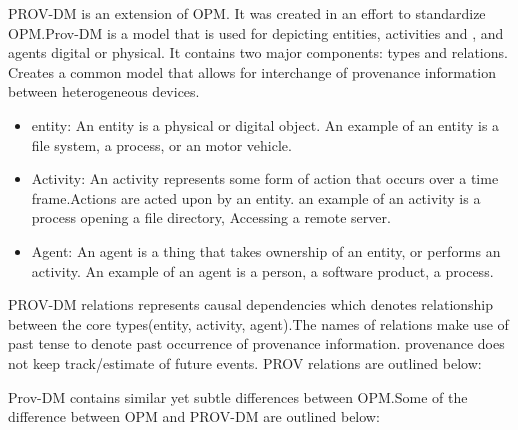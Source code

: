 PROV-DM is an extension of OPM. It was created in an effort to standardize OPM.Prov-DM is a model that is used for depicting entities, activities and , and agents digital or physical.  It contains two major components: types and relations. Creates a common model that allows for interchange of provenance information between heterogeneous devices. 

\begin{itemize}

\item entity: An entity is a physical or digital object. An example of an entity is a file system, a process, or an motor vehicle.

\item Activity: An activity represents some form of action that occurs over a time frame.Actions are acted upon by an entity. an example of an activity is a process opening a file directory, Accessing a remote server.

\item Agent: An agent is a thing that takes ownership of an entity, or performs an activity. An example of an agent is a person, a software product, a process.
\end{itemize}

PROV-DM relations represents causal dependencies which denotes relationship between the core types(entity, activity, agent).The names of relations make use of past tense to denote past occurrence of provenance information. provenance does not keep track/estimate of future events. PROV relations are outlined below:

Prov-DM contains similar yet subtle differences between OPM.Some of the difference between OPM and PROV-DM are outlined below:

